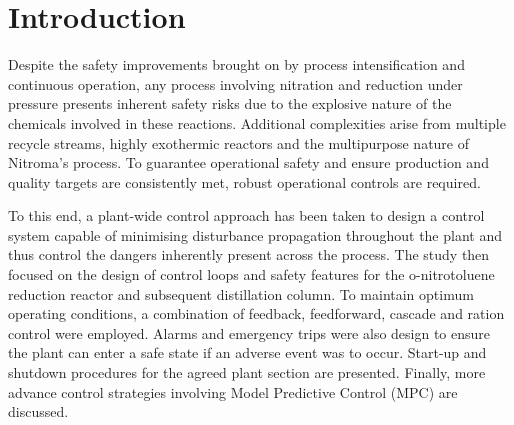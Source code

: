 \section{Introduction}%

Despite the safety improvements brought on by process intensification and continuous operation, any process involving nitration and reduction under pressure presents inherent safety risks due to the explosive nature of the chemicals involved in these reactions. Additional complexities arise from multiple recycle streams, highly exothermic reactors and the multipurpose nature of Nitroma's process. To guarantee operational safety and ensure production and quality targets are consistently met, robust operational controls are required.  

To this end, a plant-wide control approach has been taken to design a control system capable of minimising disturbance propagation throughout the plant and thus control the dangers inherently present across the process. The study then focused on the design of control loops and safety features for the o-nitrotoluene reduction reactor and subsequent distillation column. To maintain optimum operating conditions, a combination of feedback, feedforward, cascade and ration control were employed. Alarms and emergency trips were also design to ensure the plant can enter a safe state if an adverse event was to occur. Start-up and shutdown procedures for the agreed plant section are presented. Finally, more advance control strategies involving Model Predictive Control (MPC) are discussed.


